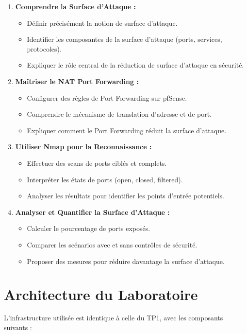 \documentclass[12pt,a4paper,openany]{report}
\begin{document}
	\begin{enumerate}[leftmargin=*]
		\item \textbf{Comprendre la Surface d'Attaque :}
		\begin{itemize}
			\item Définir précisément la notion de surface d'attaque.
			\item Identifier les composantes de la surface d'attaque (ports, services, protocoles).
			\item Expliquer le rôle central de la réduction de surface d'attaque en sécurité.
		\end{itemize}
		
		\item \textbf{Maîtriser le NAT Port Forwarding :}
		\begin{itemize}
			\item Configurer des règles de Port Forwarding sur pfSense.
			\item Comprendre le mécanisme de translation d'adresse et de port.
			\item Expliquer comment le Port Forwarding réduit la surface d'attaque.
		\end{itemize}
		
		\item \textbf{Utiliser Nmap pour la Reconnaissance :}
		\begin{itemize}
			\item Effectuer des scans de ports ciblés et complets.
			\item Interpréter les états de ports (open, closed, filtered).
			\item Analyser les résultats pour identifier les points d'entrée potentiels.
		\end{itemize}
		
		\item \textbf{Analyser et Quantifier la Surface d'Attaque :}
		\begin{itemize}
			\item Calculer le pourcentage de ports exposés.
			\item Comparer les scénarios avec et sans contrôles de sécurité.
			\item Proposer des mesures pour réduire davantage la surface d'attaque.
		\end{itemize}
	\end{enumerate}
	
	\section{Architecture du Laboratoire}
	L'infrastructure utilisée est identique à celle du TP1, avec les composants suivants :
	
\end{document}
